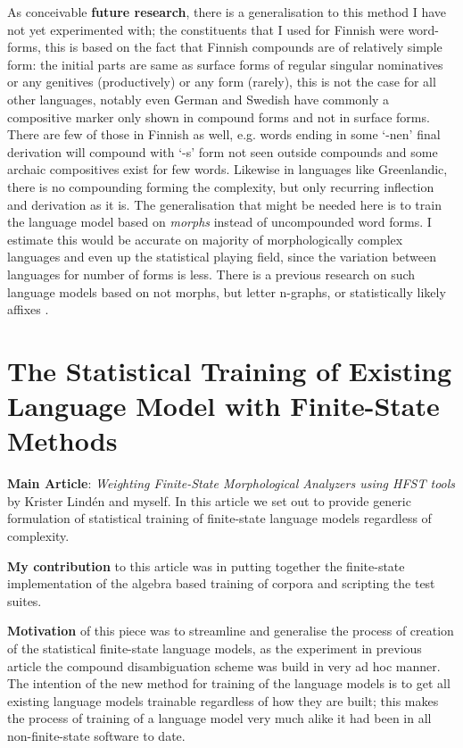 \documentclass[officiallayout,draft]{unihelcompling}
\begin{document}
As conceivable \textbf{future research}, there is a generalisation to this
method I have not yet experimented with; the constituents that I used for
Finnish were word-forms, this is based on the fact that Finnish compounds are
of relatively simple form: the initial parts are same as surface forms of
regular singular nominatives or any genitives (productively) or any form
(rarely), this is not the case for all other languages, notably even German and
Swedish have commonly a compositive marker only shown in compound forms and not
in surface forms. There are few of those in Finnish as well, e.g. words ending
in some `-nen' final derivation will compound with `-s' form not seen outside
compounds and some archaic compositives exist for few words. Likewise in
languages like Greenlandic, there is no compounding forming the complexity, but
only recurring inflection and derivation as it is. The generalisation that
might be needed here is to train the language model based on \emph{morphs}
instead of uncompounded word forms. I estimate this would be accurate on
majority of morphologically complex languages and even up the statistical
playing field, since the variation between languages for number of forms is
less.  There is a previous research on such language models based
on not morphs, but letter n-graphs, or statistically likely affixes
\cite{creutz2005morfessor}.

\section{The Statistical Training of Existing Language Model with Finite-State
Methods}

\textbf{Main Article}: \emph{Weighting Finite-State Morphological Analyzers
using HFST tools} by Krister Lindén and myself. In this article we set out
to provide generic formulation of statistical training of finite-state
language models regardless of complexity.

\textbf{My contribution} to this article was in putting together the
finite-state implementation of the algebra based training of corpora and
scripting the test suites.

\textbf{Motivation} of this piece was to streamline and generalise the process
of creation of the statistical finite-state language models, as the experiment
in previous article \cite{pirinen2009weighted} the compound disambiguation
scheme was build in very ad hoc manner. The intention of the new method
for training of the language models is to get all existing language models
trainable regardless of how they are built; this makes the process of training
of a language model very much alike it had been in all non-finite-state
software to date.
\end{document}
